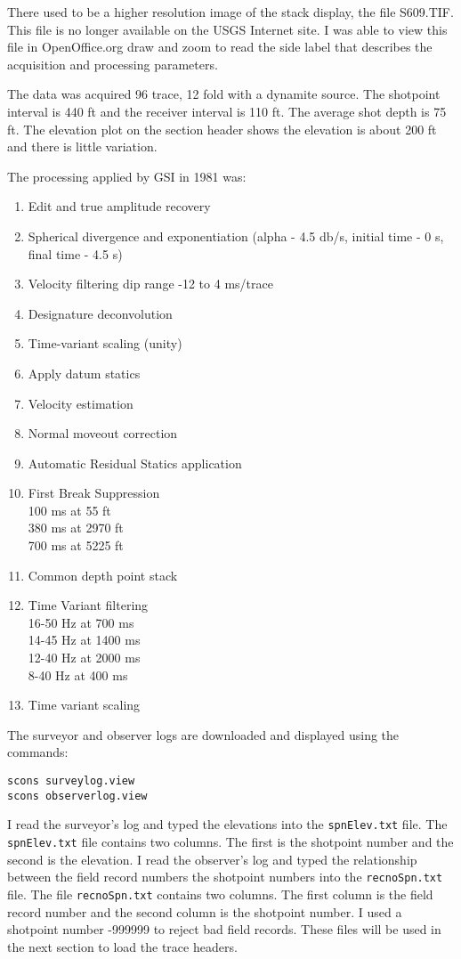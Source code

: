 There used to be a higher resolution image of the stack display, the 
file S609.TIF.  This file is no longer available on the USGS Internet 
site.  I was able to view this file in OpenOffice.org draw 
and zoom to read the side label that describes the acquisition and 
processing parameters.

The data was acquired 96 trace, 12 fold with a dynamite source.  The
shotpoint interval is 440 ft and the receiver interval is 110 ft.  The
average shot depth is 75 ft.  The elevation plot on the section header
shows the elevation is about 200 ft and there is little variation.

The processing applied by GSI in 1981 was:
\begin{enumerate}
\item Edit and true amplitude recovery
\item Spherical divergence and exponentiation
(alpha - 4.5 db/s, initial time - 0 s, final time - 4.5 s)
\item Velocity filtering dip range -12 to 4 ms/trace
\item Designature deconvolution
\item Time-variant scaling (unity)
\item Apply datum statics
\item Velocity estimation
\item Normal moveout correction
\item Automatic Residual Statics application
\item First Break Suppression \\
100 ms at 55 ft\\
380 ms at 2970 ft\\
700 ms at 5225 ft
\item Common depth point stack
\item Time Variant filtering \\
16-50 Hz at 700 ms\\
14-45 Hz at 1400 ms\\
12-40 Hz at 2000 ms\\
8-40 Hz at 400 ms
\item Time variant scaling
\end{enumerate}

The surveyor and observer logs are downloaded and displayed using the commands:
\begin{verbatim}
scons surveylog.view 
scons observerlog.view
\end{verbatim}

I read the surveyor's log and typed the elevations into the
\texttt{spnElev.txt} file.  The \texttt{spnElev.txt} file contains two
columns.  The first is the shotpoint number and the second is the
elevation.  I read the observer's log and typed the relationship
between the field record numbers the shotpoint numbers into the
\texttt{recnoSpn.txt} file.  The file \texttt{recnoSpn.txt} contains two
columns.  The first column is the field record number and the second
column is the shotpoint number. I used a shotpoint number -999999 to
reject bad field records.  These files will be used in the next
section to load the trace headers.

